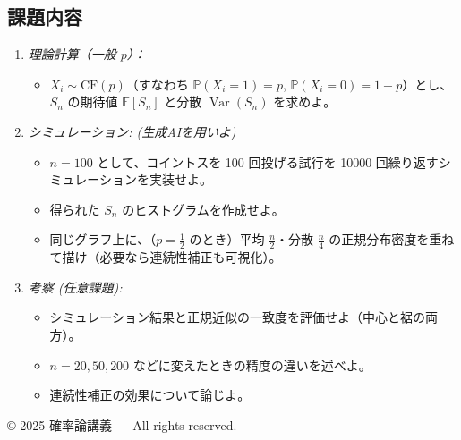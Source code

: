 \documentclass[uplatex,dvipdfmx,11pt,a4paper,openany]{bxjsbook}
\begin{document}
\subsection{課題内容}
\begin{enumerate}
\item \emph{理論計算（一般 $p$）：}
\begin{itemize}
\item $X_i\sim \mathrm{CF}(p)$（すなわち $\mathbb P(X_i=1)=p$, $\mathbb P(X_i=0)=1-p$）とし、$S_n$ の期待値 $\mathbb E[S_n]$ と分散 $\operatorname{Var}(S_n)$ を求めよ。
\end{itemize}

\item \emph{シミュレーション: (生成AIを用いよ)}
\begin{itemize}
\item $n=100$ として、コイントスを 100 回投げる試行を 10000 回繰り返すシミュレーションを実装せよ。
\item 得られた $S_n$ のヒストグラムを作成せよ。
\item 同じグラフ上に、（$p=\tfrac12$ のとき）平均 $\tfrac{n}{2}$・分散 $\tfrac{n}{4}$ の正規分布密度を重ねて描け（必要なら連続性補正も可視化）。
\end{itemize}

\item \emph{考察 (任意課題):}
\begin{itemize}
\item シミュレーション結果と正規近似の一致度を評価せよ（中心と裾の両方）。
\item $n=20, 50, 200$ などに変えたときの精度の違いを述べよ。
\item 連続性補正の効果について論じよ。
\end{itemize}

\end{enumerate}

© 2025 確率論講義 — All rights reserved.
\end{document}
